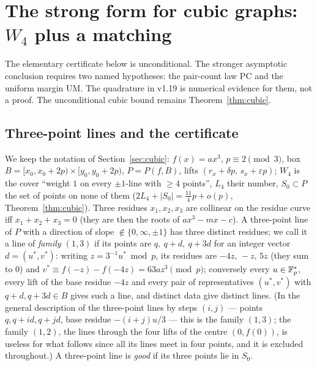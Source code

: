 
\section{The strong form for cubic graphs: \texorpdfstring{$W_4$}{W4} plus a matching}\label{sec:strong}

The elementary certificate below is unconditional.  The stronger asymptotic conclusion requires two named hypotheses:
the pair-count law PC and the uniform margin UM.  The quadrature in v1.19 is numerical evidence for them, not a proof.
The unconditional cubic bound remains Theorem~\ref{thm:cubic}.

\subsection*{Three-point lines and the certificate}

We keep the notation of Section~\ref{sec:cubic}: $f(x)=ax^3$, $p\equiv2\pmod3$, box $B=[x_0,x_0+2p)\times[y_0,y_0+2p)$, $P=P(f,B)$, lifts
$(r_x+\delta p,\,s_x+\varepsilon p)$; $W_4$ is the cover ``weight $1$ on every $\pm1$-line with $\ge4$ points'', $L_4$ their number, $S_0\subset P$
the set of points on none of them ($2L_4+|S_0|=\tfrac{11}4p+o(p)$, Theorem~\ref{thm:cubic}).  Three residues $x_1,x_2,x_3$ are collinear on
the residue curve iff $x_1+x_2+x_3=0$ (they are then the roots of $ax^3-mx-c$).  A three-point line of $P$ with a direction of slope $\notin\{0,\infty,\pm1\}$
has three distinct residues; we call it a line of \emph{family $(1,3)$} if its points are $q,\ q+d,\ q+3d$ for an integer vector $d=(u^*,v^*)$: writing
$z=3^{-1}u^*\bmod p$, its residues are $-4z,\,-z,\,5z$ (they sum to $0$) and $v^*\equiv f(-z)-f(-4z)=63az^3\pmod p$; conversely every $u\in\mathbb{F}_p^*$, every lift
of the base residue $-4z$ and every pair of representatives $(u^*,v^*)$ with $q+d,q+3d\in B$ gives such a line, and distinct data give distinct lines.
(In the general description of the three-point lines by steps $(i,j)$ — points $q,q+id,q+jd$, base residue $-(i+j)u/3$ — this is the family $(1,3)$; the
family $(1,2)$, the lines through the four lifts of the centre $(0,f(0))$, is useless for what follows since all its lines meet in four points, and it is
excluded throughout.)  A three-point line is \emph{good}
if its three points lie in $S_0$.


